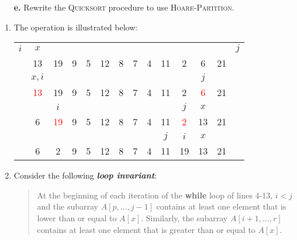 \begin{enumerate}
{\begin{enumerate}
\item[\textbf{e.}]{Rewrite the \textsc{Quicksort} procedure to use
\textsc{Hoare-Partition}.}
\end{enumerate}
}

\begin{framed}
\begin{enumerate}
\item{The operation is illustrated below:

\begin{center}
\begin{tabular}{cccccccccccccc}
  $i$ & $x$                 &                     &   &   &    &   &   &   &     &                    &                    &    & $j$\\
      & 13                  & 19                  & 9 & 5 & 12 & 8 & 7 & 4 & 11  & 2                  & 6                  & 21 &    \\
      & $x, i$              &                     &   &   &    &   &   &   &     &                    & $j$                &    &    \\
      & \textcolor{red}{13} & 19                  & 9 & 5 & 12 & 8 & 7 & 4 & 11  & 2                  & \textcolor{red}{6} & 21 &    \\
      &                     & $i$                 &   &   &    &   &   &   &     & $j$                & $x$                &    &    \\
      & 6                   & \textcolor{red}{19} & 9 & 5 & 12 & 8 & 7 & 4 & 11  & \textcolor{red}{2} & 13                 & 21 &    \\
      &                     &                     &   &   &    &   &   &   & $j$ & $i$                & $x$                &    &    \\
      & 6                   & 2                   & 9 & 5 & 12 & 8 & 7 & 4 & 11  & 19                 & 13                 & 21 &
\end{tabular}
\end{center}
}
\item{Consider the following \textbf{\emph{loop invariant}}:
\begin{quote}
At the beginning of each iteration of the \textbf{while} loop of lines 4{-}13,
$i < j$ and the subarray $A[p, \dots, j - 1]$ contains at least one element that
is lower than or equal to $A[x]$. Similarly, the subarray $A[i + 1, \dots, r]$
contains at least one element that is greater than or equal to $A[x]$.
\end{quote}
}
\end{enumerate}
\end{framed}
\end{enumerate}
